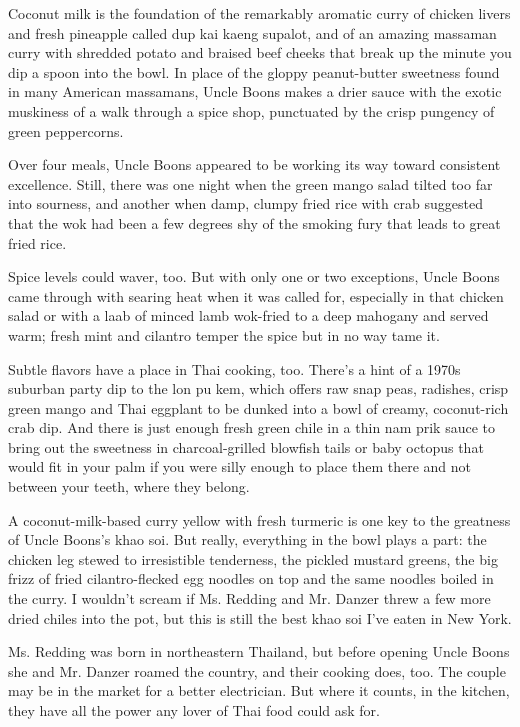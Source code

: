 Coconut milk is the foundation of the remarkably aromatic curry of
chicken livers and fresh pineapple called dup kai kaeng supalot, and of
an amazing massaman curry with shredded potato and braised beef cheeks
that break up the minute you dip a spoon into the bowl. In place of the
gloppy peanut-butter sweetness found in many American massamans, Uncle
Boons makes a drier sauce with the exotic muskiness of a walk through a
spice shop, punctuated by the crisp pungency of green peppercorns.

Over four meals, Uncle Boons appeared to be working its way toward
consistent excellence. Still, there was one night when the green mango
salad tilted too far into sourness, and another when damp, clumpy fried
rice with crab suggested that the wok had been a few degrees shy of the
smoking fury that leads to great fried rice.

Spice levels could waver, too. But with only one or two exceptions,
Uncle Boons came through with searing heat when it was called for,
especially in that chicken salad or with a laab of minced lamb wok-fried
to a deep mahogany and served warm; fresh mint and cilantro temper the
spice but in no way tame it.

Subtle flavors have a place in Thai cooking, too. There's a hint of a
1970s suburban party dip to the lon pu kem, which offers raw snap peas,
radishes, crisp green mango and Thai eggplant to be dunked into a bowl
of creamy, coconut-rich crab dip. And there is just enough fresh green
chile in a thin nam prik sauce to bring out the sweetness in
charcoal-grilled blowfish tails or baby octopus that would fit in your
palm if you were silly enough to place them there and not between your
teeth, where they belong.

A coconut-milk-based curry yellow with fresh turmeric is one key to the
greatness of Uncle Boons's khao soi. But really, everything in the bowl
plays a part: the chicken leg stewed to irresistible tenderness, the
pickled mustard greens, the big frizz of fried cilantro-flecked egg
noodles on top and the same noodles boiled in the curry. I wouldn't
scream if Ms. Redding and Mr. Danzer threw a few more dried chiles into
the pot, but this is still the best khao soi I've eaten in New York.

Ms. Redding was born in northeastern Thailand, but before opening Uncle
Boons she and Mr. Danzer roamed the country, and their cooking does,
too. The couple may be in the market for a better electrician. But where
it counts, in the kitchen, they have all the power any lover of Thai
food could ask for.

